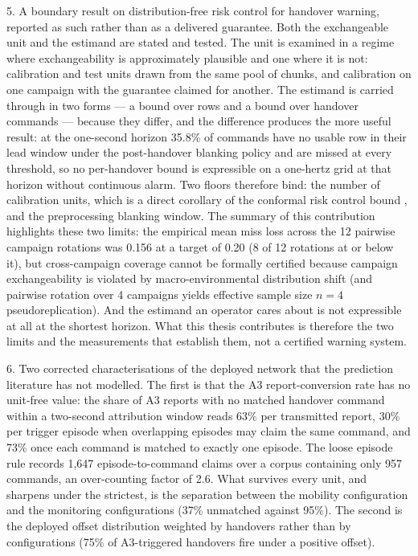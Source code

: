 5. A boundary result on distribution-free risk control for handover warning, reported as such rather than as a delivered guarantee. Both the exchangeable unit and the estimand are stated and tested. The unit is examined in a regime where exchangeability is approximately plausible and one where it is not: calibration and test units drawn from the same pool of chunks, and calibration on one campaign with the guarantee claimed for another. The estimand is carried through in two forms --- a bound over rows and a bound over handover commands --- because they differ, and the difference produces the more useful result: at the one-second horizon 35.8\% of commands have no usable row in their lead window under the post-handover blanking policy and are missed at every threshold, so no per-handover bound is expressible on a one-hertz grid at that horizon without continuous alarm. Two floors therefore bind: the number of calibration units, which is a direct corollary of the conformal risk control bound \cite{ref21}, and the preprocessing blanking window. The summary of this contribution highlights these two limits: the empirical mean miss loss across the 12 pairwise campaign rotations was 0.156 at a target of 0.20 (8 of 12 rotations at or below it), but cross-campaign coverage cannot be formally certified because campaign exchangeability is violated by macro-environmental distribution shift (and pairwise rotation over 4 campaigns yields effective sample size $n=4$ pseudoreplication). And the estimand an operator cares about is not expressible at all at the shortest horizon. What this thesis contributes is therefore the two limits and the measurements that establish them, not a certified warning system.

6. Two corrected characterisations of the deployed network that the prediction literature has not modelled. The first is that the A3 report-conversion rate has no unit-free value: the share of A3 reports with no matched handover command within a two-second attribution window reads 63\% per transmitted report, 30\% per trigger episode when overlapping episodes may claim the same command, and 73\% once each command is matched to exactly one episode. The loose episode rule records 1,647 episode-to-command claims over a corpus containing only 957 commands, an over-counting factor of 2.6. What survives every unit, and sharpens under the strictest, is the separation between the mobility configuration and the monitoring configurations (37\% unmatched against 95\%). The second is the deployed offset distribution weighted by handovers rather than by configurations (75\% of A3-triggered handovers fire under a positive offset).


